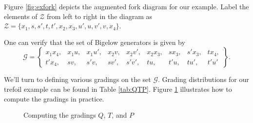 \documentclass[11pt]{article}
\theoremstyle{plain} \newtheorem{thm}{Theorem}[subsection]
\theoremstyle{plain} \newtheorem{cor}[thm]{Corollary}
\theoremstyle{plain} \newtheorem{prop}[thm]{Proposition}
\theoremstyle{plain} \newtheorem{conj}[thm]{Conjecture}
\theoremstyle{plain} \newtheorem{lem}[thm]{Lemma}
\theoremstyle{definition} \newtheorem{df}[thm]{Definition}
\theoremstyle{remark} \newtheorem{rmk}[thm]{Remark}
\theoremstyle{remark} \newtheorem{obs}[thm]{Observation}
\newcommand{\Zcal}{\mathcal{Z}}
\newcommand{\G}{\mathcal{G}}
\begin{document}
Figure \ref{fig:exfork} depicts the augmented fork diagram for our example.  Label the elements of $\Zcal$ from left to right in the diagram as $\Zcal = \{x_{1},  s,  s',t, t', x_{2}, x_{3},  u', u, v', v, x_{4}\}$.

One can verify that the set of Bigelow generators is given by
\begin{equation*}
\G = 
\begin{Bmatrix}
 x_{1}x_{4}, & x_{1}u, & x_{1}u', & x_{2}v, & x_{2}v', & x_{2}x_{3}, & sx_{3}, & s'x_{3}, & tx_{4},\\ t'x_{4}, & sv, & s'v, &sv', & s'v', & tu, & t'u, & tu', & t'u'
 \end{Bmatrix}.
\end{equation*}

We'll turn to defining various gradings on the set $\G$.  Grading distributions for our trefoil example can be found in Table \ref{tab:QTP}.  Figure \ref{fig:exQTP} illustrates how to compute the gradings in practice.

\begin{figure}[h!]
\centering
{}\quad
{}\quad
{}
\caption{Computing the gradings $Q$, $T$, and $P$ \label{fig:exQTP}}
\end{figure}
\end{document}
